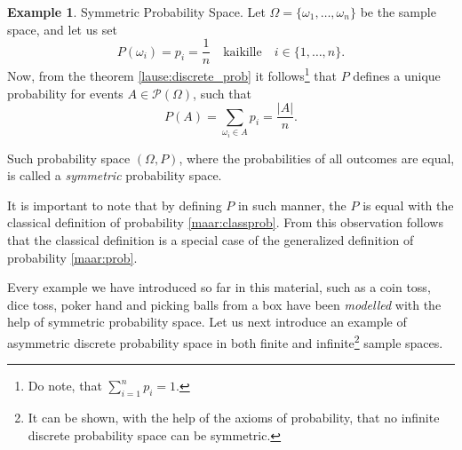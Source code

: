 \documentclass[12pt,a4paper,leqno]{report}
\theoremstyle{plain}
\theoremstyle{definition}
\newtheorem{esim}[equation]{Example}
\begin{document}
\begin{esim}
Symmetric Probability Space. Let $\Omega = \{\omega_1, \dots, \omega_n\}$ be the sample space, and let us set
\[
P(\omega_i) = p_i = \frac{1}{n} \quad \text{kaikille} \quad i \in \{1, \dots ,n\}.
\]
Now, from the theorem \ref{lause:discrete_prob} it follows\footnote{Do note, that $\sum_{i=1}^n p_i = 1$.} that $P$ defines a unique probability for events $A \in \mathcal{P}(\Omega)$, such that 
\begin{equation}
\label{eq:symmetrinen_tn}
P(A) = \sum_{\omega_i \in A} p_i = \frac{|A|}{n}. 
\end{equation}

Such probability space $(\Omega, P)$, where the probabilities of all outcomes are equal, is called a \emph{symmetric} probability space.

It is important to note that by defining $P$ in such manner, the $P$ is equal with the classical definition of probability \ref{maar:classprob}. From this observation follows that the classical definition is a special case of the generalized definition of probability \ref{maar:prob}.
\end{esim}

\bigskip

Every example we have introduced so far in this material, such as a coin toss, dice toss, poker hand and picking balls from a box have been \emph{modelled} with the help of symmetric probability space. Let us next introduce an example of asymmetric discrete probability space in both finite and infinite\footnote{It can be shown, with the help of the axioms of probability, that no infinite discrete probability space can be symmetric.} sample spaces. 
\end{document}
